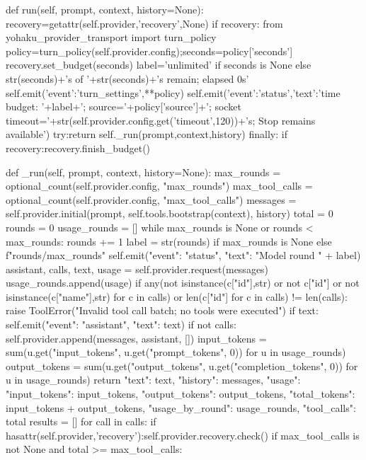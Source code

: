     def run(self, prompt, context, history=None):
        recovery=getattr(self.provider,'recovery',None)
        if recovery:
            from yohaku_provider_transport import turn_policy
            policy=turn_policy(self.provider.config);seconds=policy['seconds']
            recovery.set_budget(seconds)
            label='unlimited' if seconds is None else str(seconds)+'s of '+str(seconds)+'s remain; elapsed 0s'
            self.emit({'event':'turn_settings',**policy})
            self.emit({'event':'status','text':'time budget: '+label+'; source='+policy['source']+'; socket timeout='+str(self.provider.config.get('timeout',120))+'s; Stop remains available'})
        try:return self._run(prompt,context,history)
        finally:
            if recovery:recovery.finish_budget()

    def _run(self, prompt, context, history=None):
        max_rounds = optional_count(self.provider.config, "max_rounds")
        max_tool_calls = optional_count(self.provider.config, "max_tool_calls")
        messages = self.provider.initial(prompt, self.tools.bootstrap(context), history)
        total = 0
        rounds = 0
        usage_rounds = []
        while max_rounds is None or rounds < max_rounds:
            rounds += 1
            label = str(rounds) if max_rounds is None else f"{rounds}/{max_rounds}"
            self.emit({"event": "status", "text": "Model round " + label})
            assistant, calls, text, usage = self.provider.request(messages)
            usage_rounds.append(usage)
            if any(not isinstance(c["id"],str) or not c["id"] or not isinstance(c["name"],str) for c in calls) or len({c["id"] for c in calls}) != len(calls):
                raise ToolError("Invalid tool call batch; no tools were executed")
            if text:
                self.emit({"event": "assistant", "text": text})
            if not calls:
                self.provider.append(messages, assistant, [])
                input_tokens = sum(u.get("input_tokens", u.get("prompt_tokens", 0)) for u in usage_rounds)
                output_tokens = sum(u.get("output_tokens", u.get("completion_tokens", 0)) for u in usage_rounds)
                return {"text": text, "history": messages,
                    "usage": {"input_tokens": input_tokens, "output_tokens": output_tokens, "total_tokens": input_tokens + output_tokens},
                    "usage_by_round": usage_rounds, "tool_calls": total}
            results = []
            for call in calls:
                if hasattr(self.provider,'recovery'):self.provider.recovery.check()
                if max_tool_calls is not None and total >= max_tool_calls:
